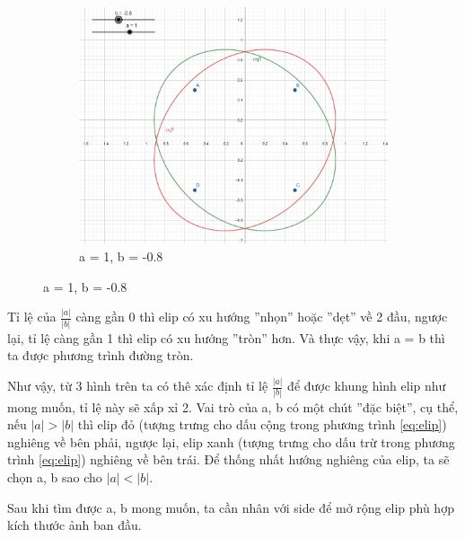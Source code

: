 \documentclass[]{article}
\begin{document}
\begin{figure}[!ht]
\begin{subfigure}[b]{0.3\linewidth}
    \includegraphics[width=\linewidth]{image/square_illustrator_3.png}
    \caption{a = 1, b = -0.8}
  \end{subfigure}
\end{figure} \par
Tỉ lệ của $\frac{\left\lvert a \right\rvert}{\left\lvert b\right\rvert }$ càng gần 0 thì elip có xu hướng ''nhọn'' hoặc ''dẹt'' về 2 đầu, ngược lại, tỉ lệ càng gần 1 thì elip có xu hướng ''tròn'' hơn. Và thực vậy, khi a = b thì ta được phương trình đường tròn. \par
Như vậy, từ 3 hình trên ta có thê xác định tỉ lệ $\frac{\left\lvert a \right\rvert}{\left\lvert b\right\rvert }$ để được khung hình elip như mong muốn, tỉ lệ này sẽ xấp xỉ 2. Vai trò của a, b có một chút ''đặc biệt'', cụ thể, nếu $\left\lvert a \right\rvert > \left\lvert b \right\rvert$ thì elip đỏ (tượng trưng cho dấu cộng trong phương trình \ref{eq:elip}) nghiêng về bên phải, ngược lại, elip xanh (tượng trưng cho dấu trừ trong phương trình \ref{eq:elip}) nghiêng về bên trái. Để thống nhất hướng nghiêng của elip, ta sẽ chọn a, b sao cho $\left\lvert a \right\rvert < \left\lvert b \right\rvert$. \par
Sau khi tìm được a, b mong muốn, ta cần nhân với side để mở rộng elip phù hợp kích thước ảnh ban đầu.
\end{document}
